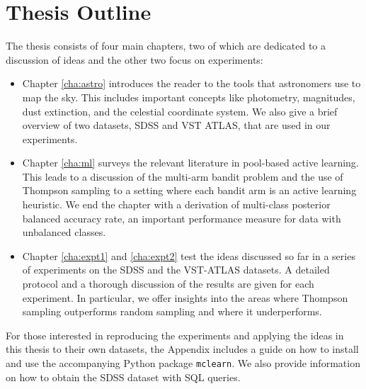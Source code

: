 \section{Thesis Outline}
\label{sec:orgnisation}
The thesis consists of four main chapters, two of which are dedicated to a discussion of ideas and
the other two focus on experiments:
	\begin{itemize}
		\item Chapter \ref{cha:astro} introduces the reader to the tools that astronomers use
		to map the sky. This includes important concepts like photometry, magnitudes, dust
		extinction, and the celestial coordinate system. We also give a brief overview of
		two datasets, SDSS and VST ATLAS, that are used in our experiments.
		
		\item Chapter \ref{cha:ml} surveys the relevant literature in pool-based active learning. This leads
		to  a discussion of the multi-arm bandit problem and the use of Thompson sampling to a
		setting where each bandit arm is an active learning heuristic. We end the chapter with a 
		derivation of multi-class posterior balanced accuracy rate, an important
		performance measure for data with unbalanced classes.
		
		\item Chapter \ref{cha:expt1} and \ref{cha:expt2} test the ideas discussed so far in a
		series of experiments on the SDSS and the VST-ATLAS datasets. A detailed protocol and a
		thorough discussion of the results are given for each experiment. In particular, we offer
		insights into the areas where Thompson sampling outperforms random sampling and where it
		underperforms. 
	\end{itemize}
For those interested in reproducing the experiments and applying the ideas in this thesis
to their own datasets, the Appendix includes a guide on how to install and use the accompanying
Python package \texttt{mclearn}. We also provide information on how to obtain the SDSS dataset
with SQL queries.


